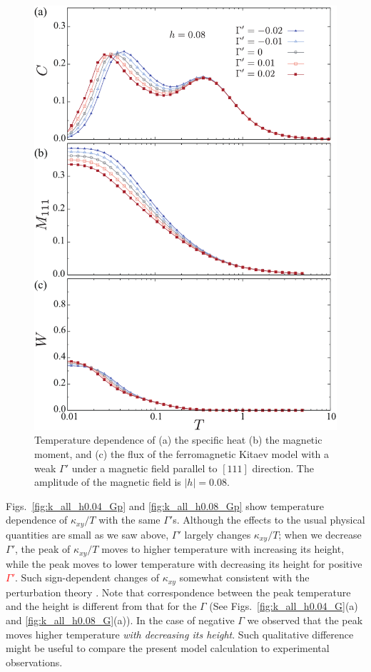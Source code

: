 \documentclass[reprint,amsmath,amssymb,aps,prx]{revtex4-2}
\newcommand{\red}[1]{\textcolor{red}{#1}}
\begin{document}
\begin{figure}
  \begin{center}
    \includegraphics[width=0.9\linewidth]{Figs/plot_CMF_h0.08_Gp.pdf}
  \end{center}
  \caption{Temperature dependence of (a) the specific heat (b) the magnetic moment, and (c) the flux of the ferromagnetic Kitaev model with a weak $\Gamma'$ under a magnetic field parallel to $[111]$ direction. The amplitude of the magnetic field is $|h|=0.08$.}
  \label{fig:CMF_h0.08_Gp}
\end{figure}

 Figs.~\ref{fig:k_all_h0.04_Gp} and \ref{fig:k_all_h0.08_Gp} show temperature dependence of $\kappa_{xy}/T$ with the same $\Gamma'$s. Although the effects to the usual physical quantities are small as we saw above, $\Gamma'$ largely changes $\kappa_{xy}/T$; when we decrease $\Gamma'$, the peak of $\kappa_{xy}/T$ moves to higher temperature with increasing its height, while the peak moves to lower temperature with decreasing its height for positive \red{$\Gamma'$}. Such sign-dependent changes of $\kappa_{xy}$ somewhat consistent with the perturbation theory \cite{TakikawaF2020}. Note that correspondence between the peak temperature and the height is different from that for the $\Gamma$ (See Figs.~\ref{fig:k_all_h0.04_G}(a) and \ref{fig:k_all_h0.08_G}(a)). In the case of negative $\Gamma$ we observed that the peak moves higher temperature \textit{with decreasing its height}. Such qualitative difference might be useful to compare the present model calculation to experimental observations. 
\end{document}
